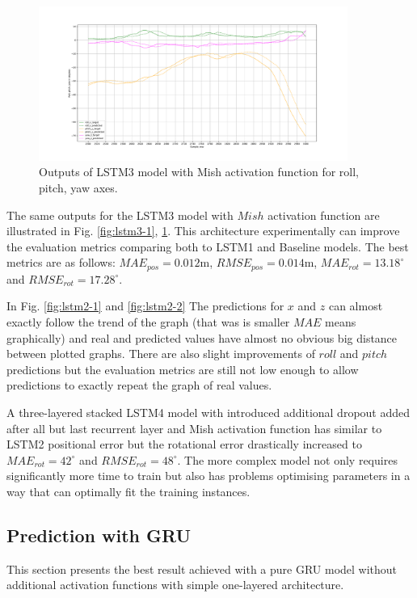 \begin{figure}[b!]
	\begin{center}
		\includegraphics[width=0.9\textwidth, keepaspectratio]{gfx/lstm3_mish-roll_pitch_yaw.pdf}
		\caption{\label{fig:lstm3-2} Outputs of LSTM3 model with Mish activation function for roll, pitch, yaw axes.}
	\end{center}
\end{figure}

The same outputs for the LSTM3 model with $Mish$ activation function are illustrated in Fig. \ref{fig:lstm3-1}, \ref{fig:lstm3-2}. This architecture experimentally can improve the evaluation metrics comparing both to LSTM1 and Baseline models. The best metrics are as follows: $MAE_{pos} = 0.012$m, $RMSE_{pos} = 0.014$m, $MAE_{rot} = 13.18^{\circ}$ and $RMSE_{rot} =17.28^{\circ}$.

In Fig. \ref{fig:lstm2-1} and \ref{fig:lstm2-2} The predictions for $x$ and $z$ can almost exactly follow the trend of the graph (that was is smaller $MAE$ means graphically) and real and predicted values have almost no obvious big distance between plotted graphs. There are also slight improvements of $roll$ and $pitch$ predictions but the evaluation metrics are still not low enough to allow predictions to exactly repeat the graph of real values. 

A three-layered stacked LSTM4 model with introduced additional dropout added after all but last recurrent layer and Mish activation function has similar to LSTM2 positional error but the rotational error drastically increased to $MAE_{rot} = 42^{\circ}$ and $RMSE_{rot} =48^{\circ}$. The more complex model not only requires significantly more time to train but also has problems optimising parameters in a way that can optimally fit the training instances. 

\subsection{Prediction with GRU}
\label{sec:eval:experiments:gru}
This section presents the best result achieved with a pure GRU model without additional activation functions with simple one-layered architecture. 

